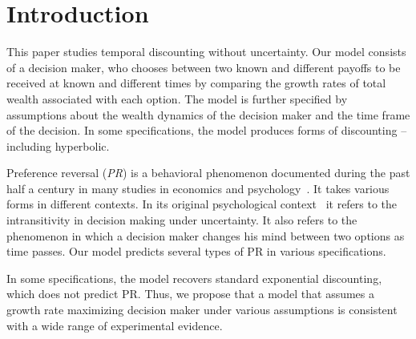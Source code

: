 \documentclass[11pt]{article}
\numberwithin{equation}{section}
\begin{document}
\section{Introduction}\label{sec:introduction}

This paper studies temporal discounting without uncertainty. Our model consists of a decision maker, who chooses between two known and different payoffs to be received at known and different times by comparing the growth rates of total wealth associated with each option. The model is further specified by assumptions about the wealth dynamics of the decision maker and the time frame of the decision. In some specifications, the model produces forms of discounting -- including hyperbolic.

Preference reversal (\textit{PR}) is a behavioral phenomenon documented during the past half a century in many studies in economics and psychology~\citep{lichtenstein1971reversals,lindman1971inconsistent,grether1979economic,loomes1983rationale,tversky1990causes,ainslie1992picoeconomics,laibson1997golden}. It takes various forms in different contexts. In its original psychological context~\citep{tversky1969intransitivity,lichtenstein1971reversals} it refers to the intransitivity in decision making under uncertainty. It also refers to the phenomenon in which a decision maker changes his mind between two options as time passes. Our model predicts several types of PR in various specifications.

In some specifications, the model recovers standard exponential discounting, which does not predict PR. Thus, we propose that a model that assumes a growth rate maximizing decision maker under various assumptions is consistent with a wide range of experimental evidence.

\end{document}
